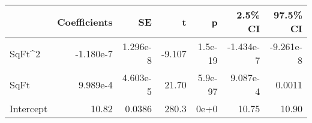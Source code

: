 \begin{tabular}{lrrrrrr}
\toprule
{} &  Coefficients &       SE &      t &       p &   2.5\% CI &  97.5\% CI \\
\midrule
SqFt\textasciicircum 2    &     -1.180e-7 & 1.296e-8 & -9.107 & 1.5e-19 & -1.434e-7 & -9.261e-8 \\
SqFt      &      9.989e-4 & 4.603e-5 &  21.70 & 5.9e-97 &  9.087e-4 &    0.0011 \\
Intercept &         10.82 &   0.0386 &  280.3 &    0e+0 &     10.75 &     10.90 \\
\bottomrule
\end{tabular}
